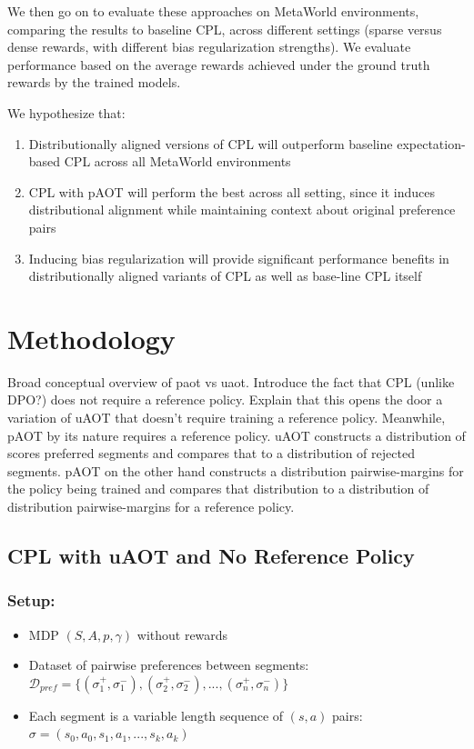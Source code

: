 \documentclass[11pt]{article}
\begin{document}
        We then go on to evaluate these approaches on MetaWorld environments, comparing the results to baseline CPL, across different settings (sparse versus dense rewards, with different bias regularization strengths). We evaluate performance based on the average rewards achieved under the ground truth rewards by the trained models.
        
        We hypothesize that:

\begin{enumerate}
    \item Distributionally aligned versions of CPL will outperform baseline expectation-based CPL across all MetaWorld environments
    \item CPL with pAOT will perform the best across all setting, since it induces distributional alignment while maintaining context about original preference pairs
    \item Inducing bias regularization will provide significant performance benefits in distributionally aligned variants of CPL as well as base-line CPL itself
\end{enumerate}


\newpage

\section{Methodology}
\label{sec:methodology}

Broad conceptual overview of paot vs uaot.
Introduce the fact that CPL (unlike DPO?) does not require a reference policy. Explain that this opens the door a variation of uAOT that doesn't require training a reference policy. Meanwhile, pAOT by its nature requires a reference policy. uAOT constructs a distribution of scores preferred segments and compares that to a distribution of rejected segments. pAOT on the other hand constructs a distribution pairwise-margins for the policy being trained and compares that distribution to a distribution of distribution pairwise-margins for a reference policy.


\subsection{CPL with uAOT and No Reference Policy}

\subsubsection*{Setup:}
\begin{itemize}
    \item MDP $(S,A,p,\gamma)$ without rewards
    \item Dataset of pairwise preferences between segments: $\mathcal{D}_{pref} = \{(\sigma_1^+, \sigma_1^-), (\sigma_2^+, \sigma_2^-), ..., (\sigma_n^+, \sigma_n^-)\}$
    \item Each segment is a variable length sequence of $(s, a)$ pairs: $\sigma = (s_0, a_0, s_1, a_1, ..., s_k, a_k)$

\end{itemize}
\end{document}
